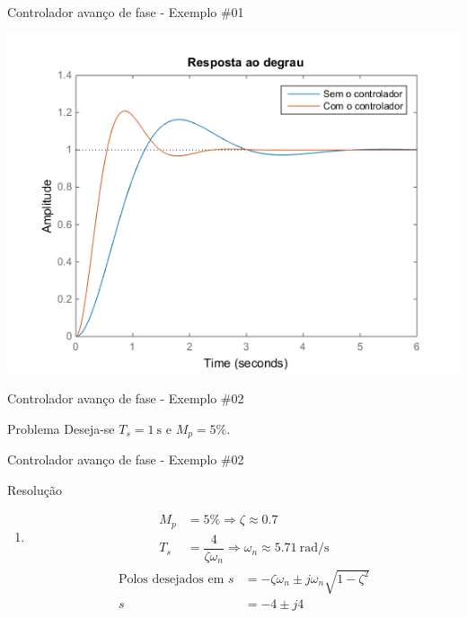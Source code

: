 \begin{frame}{Controlador avanço de fase - Exemplo \#01}
\centerline{\includegraphics[width=0.8\linewidth]{Figuras/Ch09/fig5.png}}
\end{frame}


\begin{frame}{Controlador avanço de fase - Exemplo \#02}
\begin{block}{Problema}
Deseja-se $T_s=\SI{1}{\second} $ e $ M_p = 5 \%$.
\end{block}

\vspace{1cm}

\centering

\scalebox{0.9}{}
\end{frame}


\begin{frame}{Controlador avanço de fase - Exemplo \#02}
\begin{block}{Resolução}
\begin{enumerate}
	\item \begin{align*}
	M_p&=5\%\Rightarrow \zeta\approx \num{0,7}\\
	T_s&=\dfrac{4}{\zeta \omega_n}\Rightarrow\omega_n\approx\SI{5,71}{\radian\per\second}
	\end{align*}
	\begin{align*}
			\text{Polos desejados em }s&=-\zeta\omega_n\pm j\omega_n\sqrt{1-\zeta^{2}}\\
			s&=-4\pm j4
	\end{align*}
\end{enumerate}
\end{block}
\end{frame}


